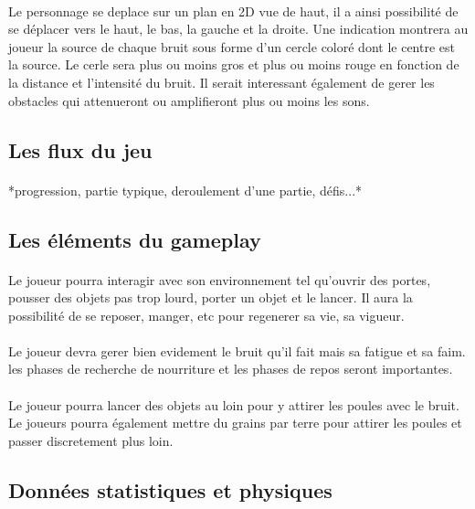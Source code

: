 \documentclass[a4paper,10pt]{article}
\begin{document}
			\paragraph{} Le personnage se deplace sur un plan en 2D vue de haut, 
il a ainsi possibilité de se déplacer vers le haut, le bas, la gauche et la 
droite. Une indication montrera au joueur la source de chaque bruit sous forme 
d'un cercle coloré dont le centre est la source. Le cerle sera plus ou moins 
gros et plus ou moins rouge en fonction de la distance et l'intensité du bruit. 
Il serait interessant également de gerer les obstacles qui attenueront ou 
amplifieront plus ou moins les sons.

		\subsection{Les flux du jeu}
			\paragraph{} *progression, partie typique, deroulement d'une 
partie,	défis...*

		\subsection{Les éléments du gameplay}
			\paragraph{} Le joueur pourra interagir avec son environnement tel 
qu'ouvrir des portes, pousser des objets pas trop lourd, porter un objet et le 
lancer. Il aura la possibilité de se reposer, manger, etc pour regenerer sa vie, 
sa vigueur.
			\paragraph{} Le joueur devra gerer bien evidement le bruit qu'il 
fait mais sa fatigue et sa faim. les phases de recherche de nourriture et les 
phases de repos seront importantes.
			\paragraph{} Le joueur pourra lancer des objets au loin pour y 
attirer les poules avec le bruit. Le joueurs pourra également mettre du grains 
par terre pour attirer les poules et passer discretement plus loin.

		\subsection{Données statistiques et physiques}
		
\end{document}
